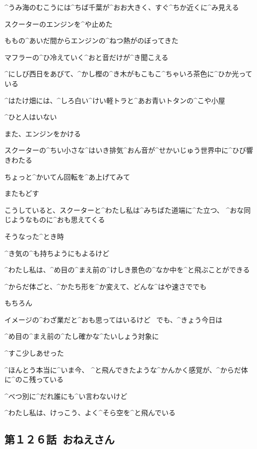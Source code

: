 \page
\Alpha ^{うみ}{海}のむこうには^{ちば}{千葉}が^{おお}{大}きく、すぐ^{ちか}{近}くに^{み}{見}える

\Alpha スクーターのエンジンを^{や}{止}めた

\Alpha ももの^{あいだ}{間}からエンジンの^{ねつ}{熱}がのぼってきた

\page
\Alpha マフラーの^{ひ}{冷}えていく^{おと}{音}だけが^{き}{聞}こえる

\Alpha ^{にしび}{西日}をあびて、^{かし}{樫}の^{き}{木}がもこもこ^{ちゃいろ}{茶色}に^{ひか}{光}っている

\Alpha ^{はたけ}{畑}には、^{しろ}{白}い^{けい}{軽}トラと^{あお}{青}いトタンの^{こや}{小屋}

\Alpha ^{ひと}{人}はいない

\page[73]
\Alpha また、エンジンをかける

\Alpha スクーターの^{ちい}{小}さな^{はいき}{排気}^{おん}{音}が^{せかいじゅう}{世界中}に^{ひび}{響}きわたる

\page
\Alpha ちょっと^{かいてん}{回転}を^{あ}{上}げてみて

\Alpha またもどす

\page
\Alpha こうしていると、スクーターと^{わたし}{私}は^{みちばた}{道端}に^{た}{立}つ、
^{おな}{同}じようなものに^{おも}{思}えてくる

\Alpha そうなった^{とき}{時}

\Alpha ^{き}{気}の^{も}{持}ちようにもよるけど

\page
\Alpha ^{わたし}{私}は、^{め}{目}の^{まえ}{前}の^{けしき}{景色}の^{なか}{中}を^{と}{飛}ぶことができる

\page
\Alpha ^{からだ}{体}ごと、^{かたち}{形}を^{か}{変}えて、どんな^{はや}{速}さででも

\page
\Alpha もちろん

\Alpha イメージの^{わざ}{業}だと^{おも}{思}ってはいるけど
\ でも、^{きょう}{今日}は

\page
\Alpha ^{め}{目}の^{まえ}{前}の^{たし}{確}かな^{たいしょう}{対象}に

\Alpha ^{すこ}{少}しあせった

\page[81]
\Alpha ^{ほんとう}{本当}に^{いま}{今}、
^{と}{飛}んできたような^{かんかく}{感覚}が、^{からだ}{体}に^{のこ}{残}っている

\page
\Alpha ^{べつ}{別}に^{だれ}{誰}にも^{い}{言}わないけど

\Alpha ^{わたし}{私}は、けっこう、よく^{そら}{空}を^{と}{飛}んでいる


\subsection{第１２６話\ おねえさん}

